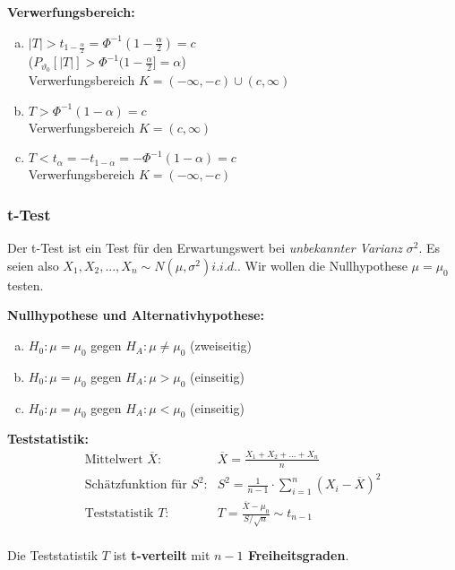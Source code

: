\textbf{Verwerfungsbereich:}
\begin{enumerate}[a)]
	\item $|T|>t_{1-\frac{\alpha}{2}}=\Phi^{-1}(1-\frac{\alpha}{2})=c$ \\ 
	($P_{\vartheta_0}[|T|]>\Phi^{-1}(1-\frac{\alpha}{2}]=\alpha$) \\
	Verwerfungsbereich $K=(-\infty,-c) \cup (c,\infty)$
	\item $T>\Phi^{-1}(1-\alpha)=c$ \\
	Verwerfungsbereich $K=(c,\infty)$
	\item $T<t_{\alpha}=-t_{1-\alpha}=-\Phi^{-1}(1-\alpha)=c$ \\
	Verwerfungsbereich $K=(-\infty,-c)$
\end{enumerate}

\subsubsection{t-Test}
Der t-Test ist ein Test für den Erwartungswert bei \emph{unbekannter Varianz} $\sigma^2$. Es seien also $X_1,X_2,...,X_n \sim N(\mu,\sigma^2) i.i.d.$. Wir wollen die Nullhypothese $\mu=\mu_0$ testen.

\vspace{10pt}

\textbf{Nullhypothese und Alternativhypothese:}
\begin{enumerate}[a)]
	\item $H_0: \mu=\mu_0$ gegen $H_A:\mu\neq \mu_0$ (zweiseitig)
	\item $H_0: \mu=\mu_0$ gegen $H_A:\mu > \mu_0$ (einseitig)
	\item $H_0: \mu=\mu_0$ gegen $H_A:\mu < \mu_0$ (einseitig)
\end{enumerate}

\vspace{10pt}

\textbf{Teststatistik:}
\[
\begin{array}{ll}
\text{Mittelwert $\overline{X}$:} & \overline{X}=\frac{X_1+X_2+...+X_n}{n} \\
\text{Schätzfunktion für $S^2$:} & S^2 = \frac{1}{n-1}\cdot \sum\limits_{i=1}^{n}(X_i - \overline{X})^2 \\
\text{Teststatistik $T$:} & T = \frac{\overline{X}-\mu_0}{S/\sqrt{n}}\sim t_{n-1} \\
\end{array}
\]

Die Teststatistik $T$ ist \textbf{t-verteilt} mit \textbf{$n-1$ Freiheitsgraden}.

